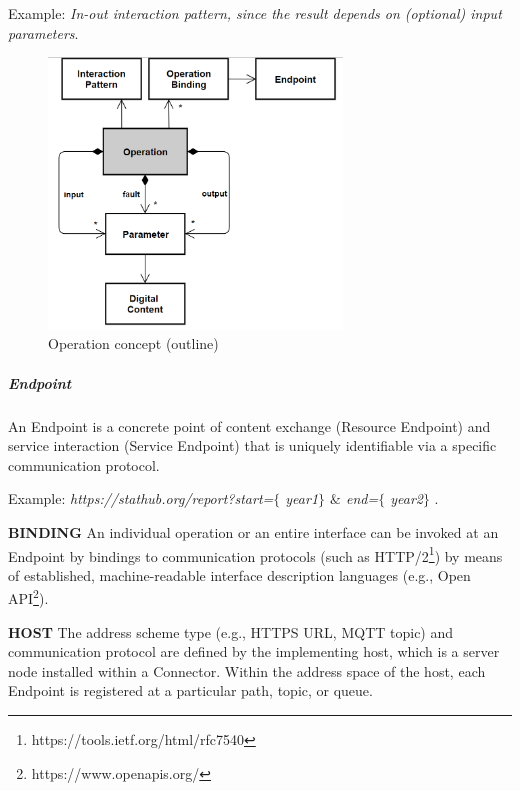 Example: \textit{In-out interaction pattern, since the result depends on (optional) input parameters}.



\begin{figure}[H]
	\begin{Center}
		\includegraphics[width=3.08in,height=2.84in]{./media/image41.png}
		\caption{Operation concept (outline)}
		\label{fig:Operation_concept_outline}
	\end{Center}
\end{figure}




\subparagraph*{Endpoint}
An Endpoint is a concrete point of content exchange (Resource Endpoint) and service interaction (Service Endpoint) that is uniquely identifiable via a specific communication protocol.

Example: \textit{https://stathub.org/report?start=$ \{ $ year1$ \} $ $\&$ end=$ \{ $ year2$ \} $ }.

\textbf{BINDING }An individual operation or an entire interface can be invoked at an Endpoint by bindings to communication protocols (such as HTTP/2\footnote{https://tools.ietf.org/html/rfc7540 }) by means of established, machine-readable interface description languages (e.g., Open API\footnote{https://www.openapis.org/ }).

\textbf{HOST }The address scheme type (e.g., HTTPS URL, MQTT topic) and communication protocol are defined by the implementing host, which is a server node installed within a Connector. Within the address space of the host, each Endpoint is registered at a particular path, topic, or queue. 

